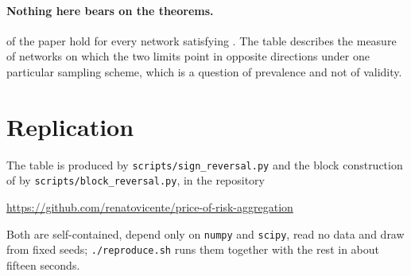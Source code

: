 \paragraph{Nothing here bears on the theorems.}
 of the paper hold for every network satisfying .
The table describes the measure of networks on which the two limits point in
opposite directions under one particular sampling scheme, which is a question of
prevalence and not of validity.

\section*{Replication}

The table is produced by \texttt{scripts/sign\_reversal.py} and the block
construction of  by \texttt{scripts/block\_reversal.py}, in the
repository
%
\begin{center}
\url{https://github.com/renatovicente/price-of-risk-aggregation}
\end{center}
%
Both are self-contained, depend only on \texttt{numpy} and \texttt{scipy}, read
no data and draw from fixed seeds; \texttt{./reproduce.sh} runs them together
with the rest in about fifteen seconds.
